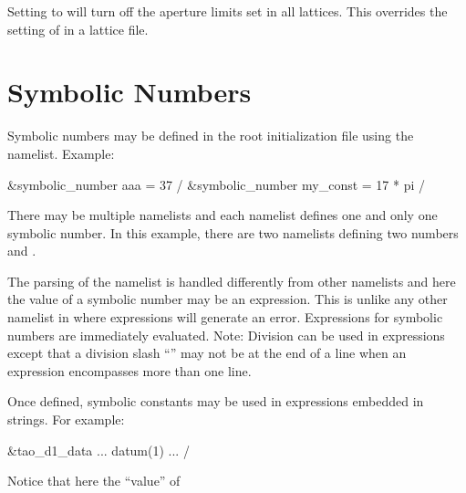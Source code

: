 {{{{{{{Setting  to  will turn off the aperture limits set in all
lattices. This overrides the setting of  in a lattice file.

\section{Symbolic Numbers}
\label{s:init.sym} 

Symbolic numbers may be defined in the root initialization file using the 
namelist. Example:
\begin{example}
  &symbolic_number aaa = 37 /
  &symbolic_number my_const = 17 * pi /
\end{example}
There may be multiple  namelists and each namelist defines one and only one
symbolic number. In this example, there are two namelists defining two numbers  and
. 

The parsing of the  namelist is handled differently from other namelists and
here the value of a symbolic number may be an expression. This is unlike any other namelist in \tao
where expressions will generate an error. Expressions for symbolic numbers are immediately
evaluated. Note: Division can be used in expressions except that a division slash ``\vn{/}'' may
not be at the end of a line when an expression encompasses more than one line.

Once defined, symbolic constants may be used in expressions embedded in strings. For example:
\begin{example}
  &tao_d1_data
    ...
    datum(1)%
    ...
  /
\end{example}
Notice that here the ``value'' of \vn{datum(1)%
the namelist is parsed.

Besides setting symbolic numbers in the main initialization file, symbolic numbers can be defined
using the \vn{set symbolic_number} command (\sref{s:set.symbolic}) and a list of symbolic numbers
can be printed using the \vn{show symbolic_number} command (\sref{s:show.symbolic}).

\section{Global Parameter Initialization}
\index{initialization!globals}
\label{s:globals} 

}}}}}}}}
